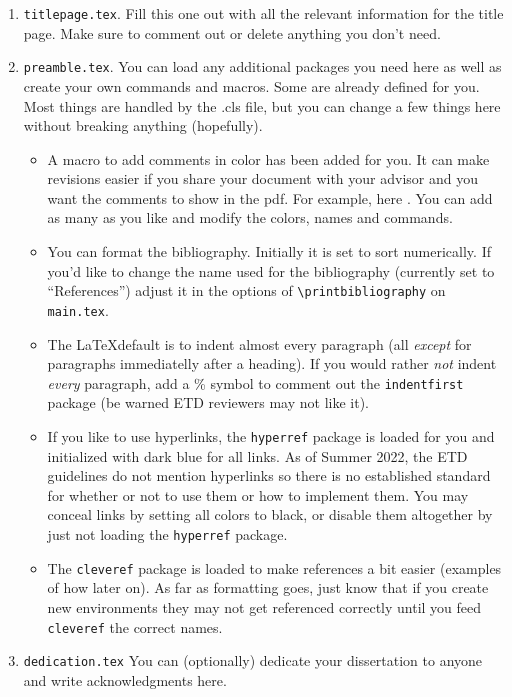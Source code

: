 \begin{enumerate}
\item \texttt{titlepage.tex}. Fill this one out with all the relevant information for the title page. Make sure to comment out or delete anything you don't need. 
\item \texttt{preamble.tex}. You can load any additional packages you need here as well as create your own commands and macros. Some are already defined for you. Most things are handled by the .cls file, but you can change a few things here without breaking anything (hopefully). 
\begin{itemize}
\item A macro to add comments in color has been added for you. It can make revisions easier if you share your document with your advisor and you want the comments to show in the pdf. For example, here . You can add as many as you like and modify the colors, names and commands.
\item You can format the bibliography. Initially it is set to sort numerically. If you'd like to change the name used for the bibliography (currently set to ``References'') adjust it in the options of \verb|\printbibliography| on \texttt{main.tex}.
\item The \LaTeX default is to indent almost every paragraph (all {\em except} for paragraphs immediatelly after a heading). If you would rather {\em not} indent {\em every} paragraph, add a \% symbol to comment out the \texttt{indentfirst} package (be warned ETD reviewers may not like it).
\item If you like to use hyperlinks, the \texttt{hyperref} package is loaded for you and initialized with {\color{pdflinkcolor}dark blue} for all links. As of Summer 2022, the ETD guidelines do not mention hyperlinks so there is no established standard for whether or not to use them or how to implement them. You may conceal links by setting all colors to black, or disable them altogether by just not loading the \texttt{hyperref} package.
\item The \texttt{cleveref} package is loaded to make references a bit easier (examples of how later on). As far as formatting goes, just know that if you create new environments they may not get referenced correctly until you feed \texttt{cleveref} the correct names.
\end{itemize}
\item \texttt{dedication.tex} You can (optionally) dedicate your dissertation to anyone and write acknowledgments here. 

\end{enumerate}
